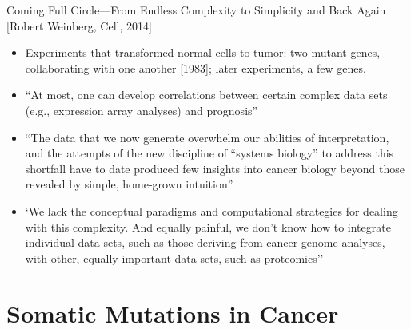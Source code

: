 \documentclass{report}
\begin{document}
Coming Full Circle—From Endless Complexity to Simplicity and Back Again [Robert Weinberg, Cell, 2014]
\begin{itemize}
	\item Experiments that transformed normal cells to tumor:  two mutant genes, collaborating with one another [1983]; later experiments, a few genes.
	
	\item ``At most, one can develop correlations between certain complex data sets (e.g., expression array analyses) and prognosis''
	
	\item ``The data that we now generate overwhelm our abilities of interpretation, and the attempts of the new discipline of “systems biology” to address this shortfall have to date produced few insights into cancer biology beyond those revealed by simple, home-grown intuition''
	
	\item `We lack the conceptual paradigms and computational strategies for dealing with this complexity. And equally painful, we don’t know how to integrate individual data sets, such as those deriving from cancer genome analyses, with other, equally important data sets, such as proteomics'' 
\end{itemize}
 




\chapter{Somatic Mutations in Cancer}
\end{document}
